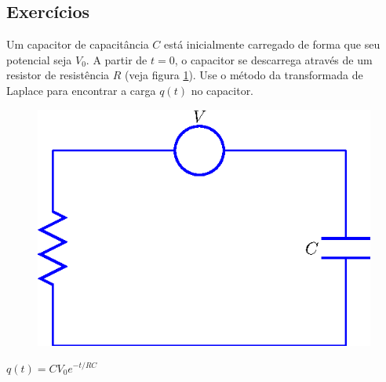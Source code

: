\subsection*{Exercícios}
\begin{exer}
Um capacitor de capacitância $C$ está inicialmente carregado de forma que seu potencial seja $V_0$. A partir de $t=0$, o capacitor se descarrega através de um resistor de resistência $R$ (veja figura \ref{circ_1}). Use o método da transformada de Laplace para encontrar a carga $q(t)$ no capacitor.
\begin{figure}[!ht]
\begin{center}

\includegraphics{cap_dirac_conv/pics/figura_14}\end{center}
\caption{\label{circ_1}}
\end{figure}
\end{exer}
\begin{resp}
 $\displaystyle q(t) = C V_0 e^{-t/RC}$
\end{resp}
